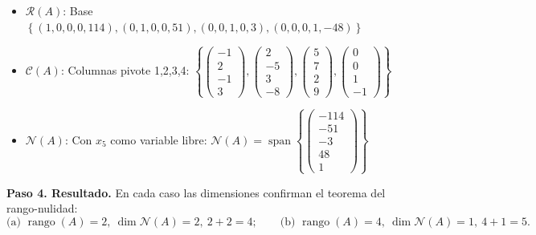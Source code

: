 \begin{example}
\begin{myproof}
\begin{itemize}
    \item $\mathcal{R}(A)$: Base $\left\{ (1,0,0,0,114), (0,1,0,0,51), (0,0,1,0,3), (0,0,0,1,-48) \right\}$
    \item $\mathcal{C}(A)$: Columnas pivote 1,2,3,4: $\left\{ \begin{pmatrix}-1\\2\\-1\\3\end{pmatrix}, \begin{pmatrix}2\\-5\\3\\-8\end{pmatrix}, \begin{pmatrix}5\\7\\2\\9\end{pmatrix}, \begin{pmatrix}0\\0\\1\\-1\end{pmatrix} \right\}$
    \item $\mathcal{N}(A)$: Con $x_5$ como variable libre: $\mathcal{N}(A) = \operatorname{span}\left\{ \begin{pmatrix}-114\\-51\\-3\\48\\1\end{pmatrix} \right\}$
\end{itemize}

\textbf{Paso 4. Resultado.} En cada caso las dimensiones confirman el teorema del rango-nulidad:
$$\boxed{\text{(a) } \operatorname{rango}(A)=2,\ \dim\mathcal{N}(A)=2,\ 2+2=4; \qquad \text{(b) } \operatorname{rango}(A)=4,\ \dim\mathcal{N}(A)=1,\ 4+1=5.}$$
\end{myproof}
\end{example}


